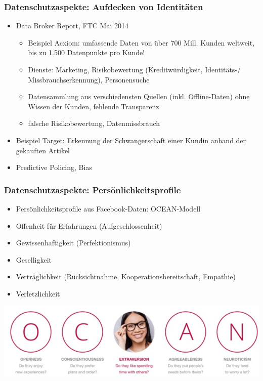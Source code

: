 
\begin{frame}
\frametitle{Datenschutzaspekte:  Aufdecken von Identitäten}

\begin{itemize}
\item Data Broker Report, FTC Mai 2014
\begin{itemize}
\item Beispiel Acxiom: umfassende Daten von über 700 Mill. Kunden weltweit,
bis zu 1.500 Datenpunkte pro Kunde!
\item Dienste: Marketing, Risikobewertung (Kreditwürdigkeit, Identitäts-/ Missbrauchserkennung), Personensuche
\item Datensammlung aus verschiedensten Quellen (inkl. Offline-Daten) ohne Wissen der Kunden, fehlende Transparenz
\item falsche Risikobewertung, Datenmissbrauch
\end{itemize}
\item Beispiel Target: Erkennung der Schwangerschaft einer Kundin anhand der gekauften Artikel
\item Predictive Policing, Bias
\end{itemize}
\end{frame}


\begin{frame}
  \frametitle{Datenschutzaspekte: Persönlichkeitsprofile}

\begin{itemize}
\item Persönlichkeitsprofile aus Facebook-Daten: OCEAN-Modell
\item Offenheit für Erfahrungen (Aufgeschlossenheit)
\item Gewissenhaftigkeit (Perfektionismus)
\item Geselligkeit
\item Verträglichkeit (Rücksichtnahme, Kooperationsbereitschaft, Empathie)
\item Verletzlichkeit
\end{itemize}

\includegraphics[scale=.7]{fig1/ocean.png}
\end{frame}


